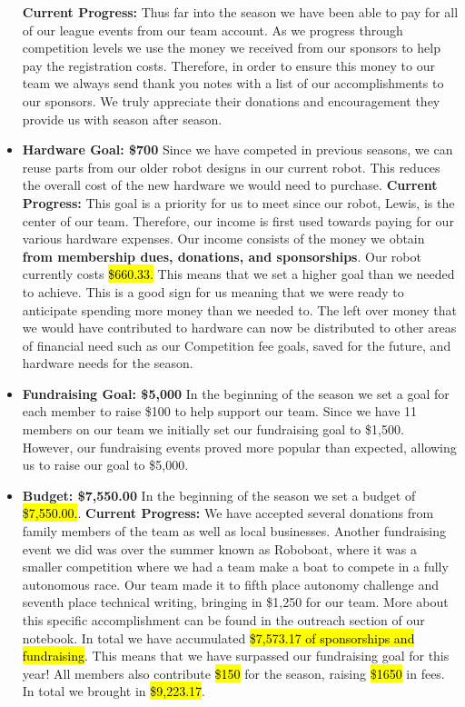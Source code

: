 \begin{itemize}
  \textbf{Current Progress: }
  Thus far into the season we have been able to pay for all of our league events from our team account. As we progress through competition levels we use the money we received from our sponsors to help pay the registration costs. Therefore, in order to ensure this money to our team we always send thank you notes with a list of our accomplishments to our sponsors. We truly appreciate their donations and encouragement they provide us with season after season. 
  \item \textbf{\Large Hardware Goal: \$700 }
  \newline 
  Since we have competed in previous seasons, we can reuse parts from our older robot designs in our current robot. This reduces the overall cost of the new hardware we would need to purchase. 
  \newline
  \textbf{Current Progress: }
  This goal is a priority for us to meet since our robot, Lewis, is the center of our team. Therefore, our income is first used towards paying for our various hardware expenses. Our income consists of the money we obtain \textbf{from membership dues, donations, and sponsorships}. Our robot currently costs \hl{\$660.33.} This means that we set a higher goal than we needed to achieve. This is a good sign for us meaning that we were ready to anticipate spending more money than we needed to. The left over money that we would have contributed to hardware can now be distributed to other areas of financial need such as our Competition fee goals, saved for the future, and hardware needs for the season.
  \item \textbf{\Large Fundraising Goal: \$5,000 }
  \newline 
In the beginning of the season we set a goal for each member to raise \$100 to help support our team. Since we have 11 members on our team we initially set our fundraising goal to \$1,500. However, our fundraising events proved more popular than expected, allowing us to raise our goal to \$5,000.
 \item \textbf{\Large Budget: \$7,550.00 }
  \newline 
In the beginning of the season we set a budget of \hl{\$7,550.00.}.
  \newline 
  \textbf{Current Progress: }We have accepted several donations from family members of the team as well as local businesses. Another fundraising event we did was over the summer known as Roboboat, where it was a smaller competition where we had a team make a boat to compete in a fully autonomous race. Our team made it to fifth place autonomy challenge and seventh place technical writing, bringing in \$1,250 for our team. More about this specific accomplishment can be found in the outreach section of our notebook. In total we have accumulated \hl{\$7,573.17 of sponsorships and fundraising}. This means that we have surpassed our fundraising goal for this year! All members also contribute \hl{\$150} for the season, raising \hl{\$1650} in fees. In total we brought in \hl{\$9,223.17}.
  
\end{itemize}

